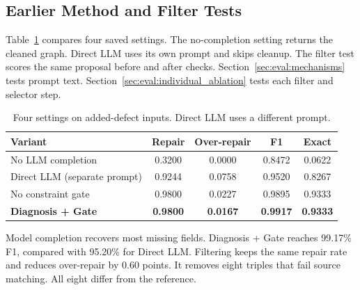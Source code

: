 \subsection{Earlier Method and Filter Tests}
\label{sec:eval:ablation}

Table~\ref{tab:repair_ablation} compares four saved settings.
The no-completion setting returns the cleaned graph.
Direct LLM uses its own prompt and skips cleanup.
The filter test scores the same proposal before and after checks.
Section~\ref{sec:eval:mechanisms} tests prompt text.
Section~\ref{sec:eval:individual_ablation} tests each filter and selector step.

\begin{table}[t]
\centering
\caption{Four settings on added-defect inputs. Direct LLM uses a different prompt.}
\label{tab:repair_ablation}
\small
\begin{tabular}{l c c c c}
\toprule
Variant & Repair & Over-repair & F1 & Exact \\
\midrule
No LLM completion & 0.3200 & 0.0000 & 0.8472 & 0.0622 \\
Direct LLM (separate prompt) & 0.9244 & 0.0758 & 0.9520 & 0.8267 \\
No constraint gate & 0.9800 & 0.0227 & 0.9895 & 0.9333 \\
\textbf{Diagnosis + Gate} & \textbf{0.9800} & \textbf{0.0167} & \textbf{0.9917} & \textbf{0.9333} \\
\bottomrule
\end{tabular}
\end{table}

Model completion recovers most missing fields.
Diagnosis + Gate reaches 99.17\% F1, compared with 95.20\% for Direct LLM.
Filtering keeps the same repair rate and reduces over-repair by 0.60 points.
It removes eight triples that fail source matching.
All eight differ from the reference.
